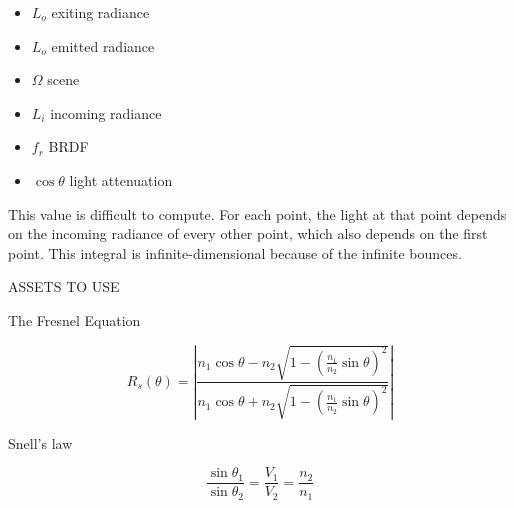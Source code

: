 \documentclass[a4paper]{article}
\begin{document}
\begin{itemize}
    \item \(L_o\) exiting radiance
    \item \(L_o\) emitted radiance
    \item \(\Omega\) scene
    \item \(L_i\) incoming radiance
    \item \(f_r\) BRDF
    \item \(\cos \theta\) light attenuation
\end{itemize}

This value is difficult to compute. For each point, the light at that point
depends on the incoming radiance of every other point, which also depends on the first point.
This integral is infinite-dimensional because of the infinite bounces.


\pagebreak

ASSETS TO USE


The Fresnel Equation

\[
    R_s(\theta) =
        \left|
            \frac
            {
                n_1\cos \theta - n_2 \sqrt{1-{\left(\frac{n_1}{n_2}\sin \theta\right)}^2}
            }
            {
                n_1\cos \theta + n_2 \sqrt{1-{\left(\frac{n_1}{n_2}\sin \theta\right)}^2}
            }
        \right|
\]

Snell's law

\[
    \frac{\sin \theta_1}{\sin \theta_2}
    = \frac{V_1}{V_2}
    = \frac{n_2}{n_1}
\]

\pagebreak

\nocite{*} %

\printbibliography
\end{document}
